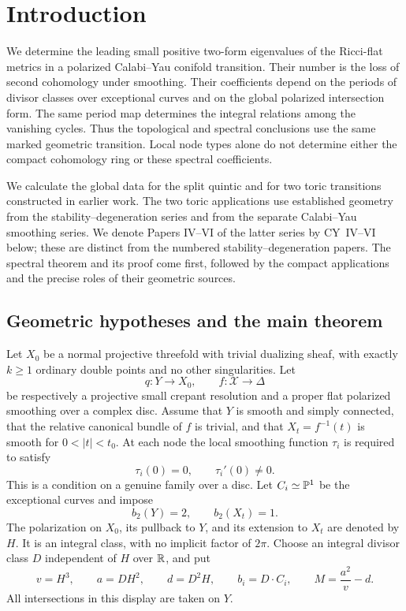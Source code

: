 \section{Introduction}\label{sec:introduction}

We determine the leading small positive two-form eigenvalues of the
Ricci-flat metrics in a polarized Calabi--Yau conifold transition.
Their number is the loss of second cohomology under smoothing. Their
coefficients depend on the periods of divisor classes over exceptional
curves and on the global polarized intersection form. The same period
map determines the integral relations among the vanishing cycles.
Thus the topological and spectral conclusions use the same marked
geometric transition. Local node types alone do not determine either
the compact cohomology ring or these spectral coefficients.

We calculate the global data for the split quintic and for two toric
transitions constructed in earlier work. The two toric applications
use established geometry from the stability--degeneration series and
from the separate Calabi--Yau smoothing series. We denote Papers
IV--VI of the latter series by CY~IV--VI below; these are distinct
from the numbered stability--degeneration papers. The spectral theorem
and its proof come first, followed by the compact applications and the
precise roles of their geometric sources.

\subsection{Geometric hypotheses and the main theorem}
Let $X_0$ be a normal projective threefold with trivial dualizing sheaf,
with exactly $k\geq1$ ordinary double points and no other singularities.
Let
\[
 q:Y\longrightarrow X_0,\qquad
 f:\mathcal X\longrightarrow\Delta
\]
be respectively a projective small crepant resolution and a proper flat
polarized smoothing over a complex disc. Assume that $Y$ is smooth and
simply connected, that the relative canonical bundle of $f$ is trivial,
and that $X_t=f^{-1}(t)$ is smooth for $0<|t|<t_0$. At each node the local
smoothing function $\tau_i$ is required to satisfy
\begin{equation}\label{eq:simple-smoothing}
 \tau_i(0)=0,\qquad \tau_i'(0)\ne0.
\end{equation}
This is a condition on a genuine family over a disc. Let $C_i\simeq\mathbb P^1$
be the exceptional curves and impose
\begin{equation}\label{eq:betti-hypotheses}
 b_2(Y)=2,\qquad b_2(X_t)=1.
\end{equation}
The polarization on $X_0$, its pullback to $Y$, and its extension to $X_t$
are denoted by $H$. It is an integral class, with no implicit factor of
$2\pi$. Choose an integral divisor class $D$ independent of $H$ over
$\mathbb R$, and put
\begin{equation}\label{eq:intersection-data}
 v=H^3,\qquad a=DH^2,\qquad d=D^2H,\qquad
 b_i=D\cdot C_i,\qquad M=\frac{a^2}{v}-d.
\end{equation}
All intersections in this display are taken on $Y$.

